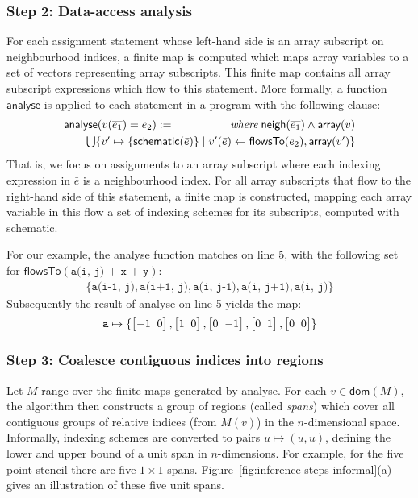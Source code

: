 \documentclass[9pt]{sigplanconf}
\theoremstyle{definition}
\newcommand{\neigh}{\textsf{neigh}}
\newcommand{\arrayTy}{\textsf{array}}
\newcommand{\vtwoh}[2]{\setlength{\arraycolsep}{0em}
\left[\begin{array}{cc}#1 \; & \; #2\end{array}\right]}
\begin{document}
\subsubsection{Step 2: Data-access analysis}
\label{sec:inf-step2}

For each assignment statement whose left-hand side is an array
subscript on neighbourhood indices, a finite map is computed which
maps array variables to a set of vectors representing array
subscripts.  This finite map contains all array subscript expressions
which flow to this statement. More formally, a function
$\textsf{analyse}$ is applied to each statement in a program with the
following clause:
%
\begin{align*}
\begin{array}{lr}
\textsf{analyse}(v(\overline{e_1}) = e_2)
 := \qquad\qquad & \textit{where} \; \neigh(\overline{e_1}) \wedge \arrayTy(v)  \\[0.3em]
\multicolumn{2}{l}{\qquad \bigcup\{v' \mapsto \{\textsf{schematic}(\bar{e})\} \mid v'(\bar{e}) \leftarrow \mathsf{flowsTo}(e_2),
  \arrayTy(v')\}}
\end{array}
\end{align*}
%
That is, we focus on assignments to an array subscript where each
indexing expression in $\bar{e}$ is a neighbourhood index.  For
all array subscripts that flow to the right-hand side of this
statement, a finite map is constructed, mapping each array variable
in this flow a set of indexing schemes for its subscripts, computed
with \textsf{schematic}.

For our example, the \textsf{analyse} function matches on
line 5, with the following set for $\textsf{flowsTo}(\texttt{a(i, j) + x +
  y})$:
%
\begin{align*}
\{\texttt{a(i-1, j)}, \texttt{a(i+1, j)}, \texttt{a(i, j-1)},
  \texttt{a(i, j+1)}, \texttt{a(i, j)}\}
\end{align*}
Subsequently the result of \textsf{analyse} on line 5 yields the map:
\begin{align*}
\texttt{a} \mapsto \{\vtwoh{-1}{0}, \vtwoh{1}{0},
          \vtwoh{0}{-1}, \vtwoh{0}{1}, \vtwoh{0}{0}\}
\end{align*}
%

\subsubsection{Step 3: Coalesce contiguous indices into regions}
\label{sec:inf-step3}

Let $M$ range over the finite maps generated by \textsf{analyse}.  For
each $v \in \mathsf{dom}(M)$, the algorithm then constructs a group
of regions (called \emph{spans}) which cover all contiguous groups of relative indices
(from $M(v)$) in the $n$-dimensional space.
Informally, indexing schemes are converted to pairs $u \mapsto (u,
u)$, defining the lower and upper bound of a unit span 
in $n$-dimensions. For
example, for the five point stencil there are five $1 \times 1$ spans.
Figure~\ref{fig:inference-steps-informal}(a) gives an illustration
of these five unit spans.
\end{document}
